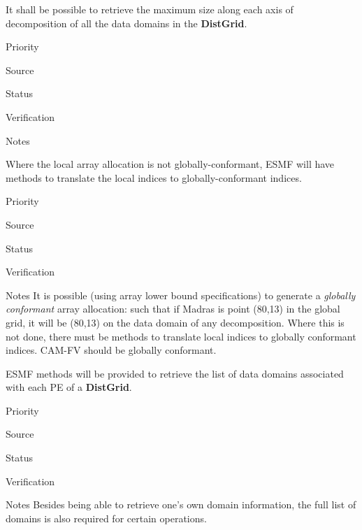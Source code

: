 
It shall be possible to retrieve the maximum size along each axis of
decomposition of all the data domains in the \textbf{DistGrid}. 

\begin{reqlist}
\item[Priority]
\item[Source]
\item[Status]
\item[Verification]
\item[Notes]
\end{reqlist}


Where the local array allocation is not globally-conformant, 
ESMF will have methods to translate the local indices to
globally-conformant indices.

\begin{reqlist}
\item[Priority]
\item[Source]
\item[Status]
\item[Verification]
\item[Notes] It is possible (using array lower bound specifications)
  to generate a \emph{globally conformant} array allocation: such that
  if Madras is point (80,13) in the global grid, it will be (80,13) on
  the data domain of any decomposition. Where this is not done, there
  must be methods to translate local indices to globally conformant
  indices.  CAM-FV should be globally conformant.
\end{reqlist}


ESMF methods will be provided to retrieve the list of data
domains associated with each PE of a  \textbf{DistGrid}.

\begin{reqlist}
\item[Priority]
\item[Source]
\item[Status]
\item[Verification]
\item[Notes] Besides being able to retrieve one's own domain
  information, the full list of domains is also required for certain
  operations.
\end{reqlist}


